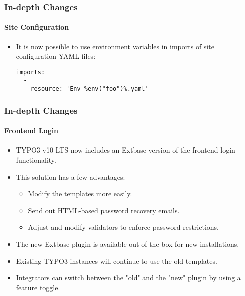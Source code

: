 
\begin{frame}[fragile]
	\frametitle{In-depth Changes}
	\framesubtitle{Site Configuration}

	\lstset{basicstyle=\tiny\ttfamily}

	\begin{itemize}

		\item It is now possible to use environment variables in imports of site configuration YAML files:
\begin{lstlisting}
imports:
  -
    resource: 'Env_%env("foo")%.yaml'
\end{lstlisting}

	\end{itemize}

\end{frame}


\begin{frame}[fragile]
	\frametitle{In-depth Changes}
	\framesubtitle{Frontend Login}

	\begin{itemize}

		\item TYPO3 v10 LTS now includes an Extbase-version of the frontend login functionality.
		\item This solution has a few advantages:

			\begin{itemize}
				\item Modify the templates more easily.
				\item Send out HTML-based password recovery emails.
				\item Adjust and modify validators to enforce password restrictions.
			\end{itemize}

		\item The new Extbase plugin is available out-of-the-box for new installations.
		\item Existing TYPO3 instances will continue to use the old templates.
		\item Integrators can switch between the "old" and the "new" plugin by using a feature toggle.

	\end{itemize}

\end{frame}

